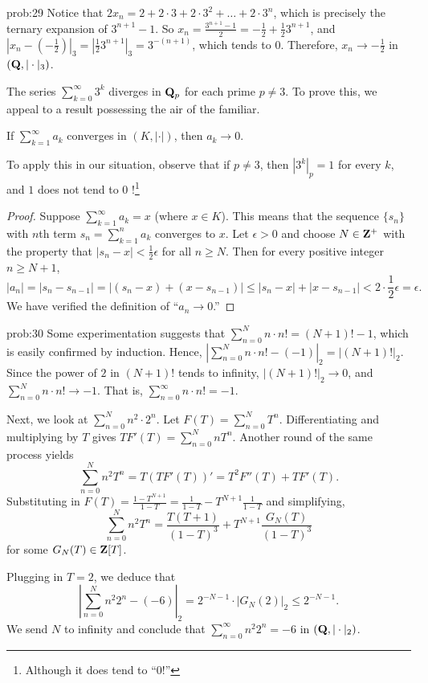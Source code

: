 \begin{sol}{prob:29} Notice that $2x_n = 2 + 2\cdot 3 + 2\cdot 3^2 + \dots + 2\cdot 3^n$, which is precisely the ternary expansion of $3^{n+1}-1$. So $x_n = \frac{3^{n+1}-1}{2} = -\frac{1}{2} + \frac{1}{2} 3^{n+1}$, and $|x_n-(-\frac{1}{2})|_{3} = |\frac{1}{2} 3^{n+1}|_{3} = 3^{-(n+1)}$, which tends to $0$. Therefore, $x_n \to -\frac{1}{2}$ in $(\mathbf{Q},|\cdot|_{3})$.

The series $\sum_{k=0}^{\infty} 3^k$ diverges in $\mathbf{Q}_p$ for each prime $p\ne 3$. To prove this, we appeal to a result possessing the air of the familiar.

\begin{lem} If $\sum_{k=1}^{\infty} a_k$ converges in $(K,|\cdot|)$, then $a_k\to 0$. 
\end{lem}

To apply this in our situation, observe that if $p\ne 3$, then $|3^k|_p=1$ for every $k$, and  $1$ does not tend to $0$ !\footnote{Although it does tend to ``$0!$''}

\begin{proof} Suppose $\sum_{k=1}^{\infty} a_k=x$ (where $x \in K$). This means that the sequence $\{s_n\}$ with $n$th term $s_n = \sum_{k=1}^{n} a_k$ converges to $x$. Let $\epsilon > 0$ and choose $N \in \mathbf{Z}^{+}$ with the property that $|s_n - x| < \frac{1}{2}\epsilon$ for all $n\ge N$. Then for every positive integer $n\ge N+1$, 
\[ |a_n| = |s_{n}-s_{n-1}| = |(s_n - x) + (x-s_{n-1})| \le |s_n-x| + |x-s_{n-1}| < 2\cdot \frac{1}{2}\epsilon = \epsilon. \]
We have verified the definition of ``$a_n\to 0$.''
\end{proof}
\end{sol}



\begin{sol}{prob:30} Some experimentation suggests that $\sum_{n=0}^{N} n\cdot n! = (N+1)!-1$, which is easily confirmed by induction. Hence, $|\sum_{n=0}^{N} n\cdot n! - (-1)|_2 = |(N+1)!|_2$. Since the power of $2$ in $(N+1)!$ tends to infinity, $|(N+1)!|_2 \to 0$, and $\sum_{n=0}^{N} n\cdot n! \to -1$. That is, $\sum_{n=0}^{\infty} n\cdot n!=-1$.

Next, we look at $\sum_{n=0}^{N} n^2 \cdot 2^n$. Let $F(T) = \sum_{n=0}^{N} T^n$. Differentiating and multiplying by $T$ gives $T F'(T) = \sum_{n=0}^{N} n T^n$. Another round of the same process yields
\[ \sum_{n=0}^{N} n^2 T^n = T(TF'(T))' = T^2 F''(T) + T F'(T). \]
Substituting in $F(T) = \frac{1-T^{N+1}}{1-T} = \frac{1}{1-T} - T^{N+1}\frac{1}{1-T}$ and simplifying,
\[ \sum_{n=0}^{N} n^2 T^n = \frac{T(T+1)}{(1-T)^3} +  T^{N+1} \frac{G_N(T)}{(1-T)^3} \]
for some $G_N(T) \in \mathbf{Z}[T]$.

Plugging in $T=2$, we deduce that
\[ \left|\sum_{n=0}^{N} n^2 2^n - (-6)\right|_2 = 2^{-N-1} \cdot |G_N(2)|_{2} \le 2^{-N-1}.\] 
We send $N$ to infinity and conclude that $\sum_{n=0}^{\infty} n^2 2^n = -6$ in $(\mathbf{Q},|\cdot|_2)$.\end{sol}


